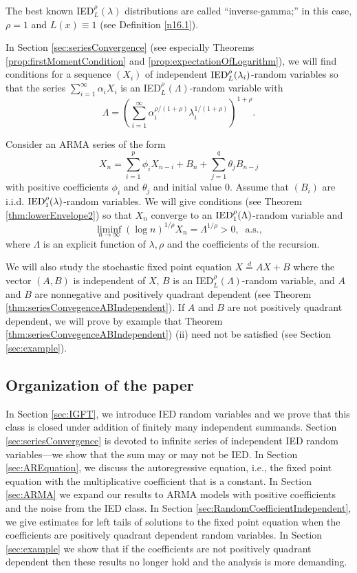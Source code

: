 \documentclass[bj]{imsart}
\numberwithin{equation}{section}
\newcommand{\IGFT}{{\rm IED}}
\newcommand{\1}{\mathbf{1}}
\theoremstyle{definition}
\begin{document}
The best known \IGFT$^\rho_L(\lambda)$ distributions  are called ``inverse-gamma;'' in this case, $\rho=1$
and $L (x) \equiv 1$ (see Definition \ref{n16.1}). 

In Section \ref{sec:seriesConvergence} (see especially  Theorems \ref{prop:firstMomentCondition} and  \ref{prop:expectationOfLogarithm}),
we will find  conditions  for a sequence $(X_i)$ of independent $\IGFT^\rho_L(\lambda_i)$-random variables  so that the series
$\sum_{i=1}^{\infty}\alpha_iX_i$
is an \IGFT$^\rho_L(\Lambda)$-random variable with  
$$\Lambda=\left(\sum_{i=1}^{\infty}\alpha_i^{\rho/(1+\rho)}\lambda_i^{1/(1+\rho)}\right)^{1+\rho}.$$

Consider an ARMA series of the form
$$X_n=\sum_{i=1}^p\phi_i X_{n-i}+B_n+\sum_{j=1}^q\theta_jB_{n-j}$$
with positive coefficients $\phi_i$ and $\theta_j$ and initial value 0. Assume that $(B_i)$ are i.i.d. $\IGFT^\rho_1(\lambda)$-random variables.
We will give  conditions (see Theorem \ref{thm:lowerEnvelope2}) so that $X_n$ converge to an $\IGFT^\rho_1(\Lambda)$-random variable and 
$$\liminf_{n\to \infty} (\log n)^{1/\rho} X_n =\Lambda^{1/\rho}>0,\ \text{ a.s.},$$
where $\Lambda$ is an explicit function of $\lambda, \rho$ and the coefficients of the recursion.

We will also study the stochastic fixed point equation 
$X\stackrel{d}{=}AX+B$ 
where the vector $(A,B)$ is independent of $X$, $B$ is an \IGFT$^\rho_L(\Lambda)$-random variable, and $A$ and $B$ are nonnegative and positively quadrant dependent (see Theorem \ref{thm:seriesConvegenceABIndependent}).
If $A$ and $B$ are not positively quadrant dependent, we will prove by example that Theorem \ref{thm:seriesConvegenceABIndependent}) (ii) need not be satisfied (see Section \ref{sec:example}).

\subsection{Organization of the paper}
In Section \ref{sec:IGFT}, we introduce \IGFT{}  random variables
and we prove that this class is closed under addition of finitely many independent summands. 
Section \ref{sec:seriesConvergence} is devoted to infinite series  of independent \IGFT{} random variables---we show that the sum may or may not be \IGFT.
In Section \ref{sec:AREquation}, we discuss the autoregressive equation, i.e.,  the fixed point equation with the multiplicative coefficient that is a constant. 
In Section \ref{sec:ARMA} we expand our results to ARMA models with positive coefficients and the noise from the \IGFT{} class.
In Section \ref{sec:RandomCoefficientIndependent}, we give estimates for  left tails of solutions to the fixed point equation when the coefficients are positively quadrant dependent random variables. In Section \ref{sec:example} we show that if the coefficients are not positively quadrant dependent then these results no longer hold and the analysis  is more demanding.
\end{document}
